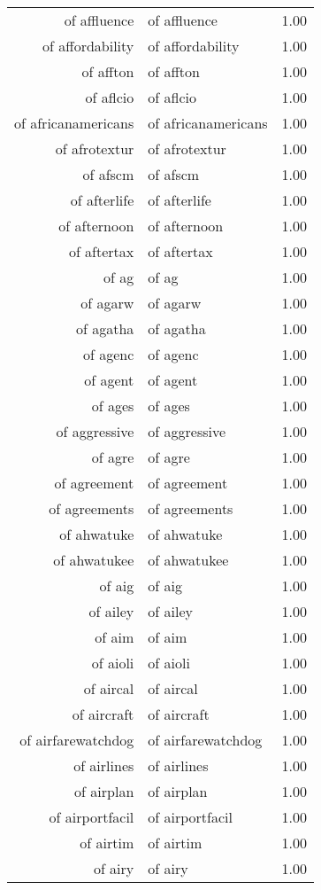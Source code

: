 \begin{table}[ht]
\begin{tabular}{rlr}
  of affluence & of affluence & 1.00 \\ 
  of affordability & of affordability & 1.00 \\ 
  of affton & of affton & 1.00 \\ 
  of aflcio & of aflcio & 1.00 \\ 
  of africanamericans & of africanamericans & 1.00 \\ 
  of afrotextur & of afrotextur & 1.00 \\ 
  of afscm & of afscm & 1.00 \\ 
  of afterlife & of afterlife & 1.00 \\ 
  of afternoon & of afternoon & 1.00 \\ 
  of aftertax & of aftertax & 1.00 \\ 
  of ag & of ag & 1.00 \\ 
  of agarw & of agarw & 1.00 \\ 
  of agatha & of agatha & 1.00 \\ 
  of agenc & of agenc & 1.00 \\ 
  of agent & of agent & 1.00 \\ 
  of ages & of ages & 1.00 \\ 
  of aggressive & of aggressive & 1.00 \\ 
  of agre & of agre & 1.00 \\ 
  of agreement & of agreement & 1.00 \\ 
  of agreements & of agreements & 1.00 \\ 
  of ahwatuke & of ahwatuke & 1.00 \\ 
  of ahwatukee & of ahwatukee & 1.00 \\ 
  of aig & of aig & 1.00 \\ 
  of ailey & of ailey & 1.00 \\ 
  of aim & of aim & 1.00 \\ 
  of aioli & of aioli & 1.00 \\ 
  of aircal & of aircal & 1.00 \\ 
  of aircraft & of aircraft & 1.00 \\ 
  of airfarewatchdog & of airfarewatchdog & 1.00 \\ 
  of airlines & of airlines & 1.00 \\ 
  of airplan & of airplan & 1.00 \\ 
  of airportfacil & of airportfacil & 1.00 \\ 
  of airtim & of airtim & 1.00 \\ 
  of airy & of airy & 1.00 \\ 

\end{tabular}
\end{table}
